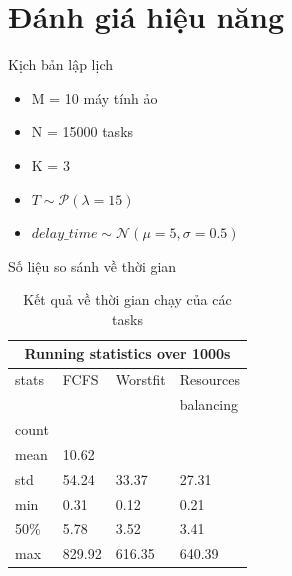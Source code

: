 \documentclass[11pt,xcolor={dvipsnames}, aspectratio=169]{beamer}
\begin{document}
\section{Đánh giá hiệu năng} 


\begin{frame}
{Kịch bản lập lịch}
\begin{itemize}
	\item M = 10 máy tính ảo 
	\item N = 15000 tasks
	\item K = 3
	\item $T \sim \mathcal{P}(\lambda = 15)$
	\item $delay\_time \sim \mathcal{N}(\mu = 5, \sigma = 0.5)$
\end{itemize}

\end{frame}


\begin{frame}
{Số liệu so sánh về thời gian}
\begin{table}[h!]
	\centering
	\caption{Kết quả về thời gian chạy của các tasks}
	\begin{tabular}{|p{1.5cm}| p{1.5cm} | p{1.5cm} | p{1.6cm}|}
		\hline
		\multicolumn{4}{|c|}{Running statistics over 1000s} \\
		\hline
		stats & FCFS & Worstfit & Resources \\
			&	&	& balancing \\
		\hline
		\hline
		count&\color{red}{13214}&\color{red}{13925}&\color{red}{14235} \\
		\hline
		mean&\color{blue}10.62&\color{blue}{6.34}&\color{blue}{5.42}\\
		\hline
		std&54.24&33.37&27.31 \\
		\hline
		min&0.31&0.12&0.21 \\
		\hline
		50\%&5.78&3.52&3.41 \\
		\hline
		max&829.92&616.35&640.39 \\
		\hline
	\end{tabular}
	\label{table:finished_tasks}
\end{table}
\end{frame}
\end{document}
